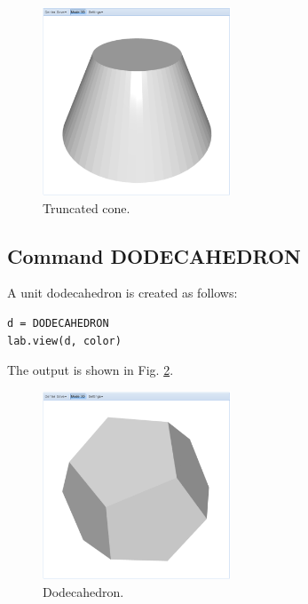 \documentclass[article,A4,12pt]{llncs}
\begin{document}
\newpage

\begin{figure}[!ht]
\begin{center}
\includegraphics[width=0.5\textwidth]{img/tcone.png}
\end{center}
\vspace{-2mm}
\caption{Truncated cone.}
\label{fig:tcone}
\end{figure}

\subsection{Command DODECAHEDRON}

A unit dodecahedron is created as follows:

\begin{verbatim}
d = DODECAHEDRON
lab.view(d, color)
\end{verbatim}
The output is shown in Fig. \ref{fig:dodeca}.

\newpage

\begin{figure}[!ht]
\begin{center}
\includegraphics[width=0.5\textwidth]{img/dodeca.png}
\end{center}
\vspace{-2mm}
\caption{Dodecahedron.}
\label{fig:dodeca}
\end{figure}
\end{document}
